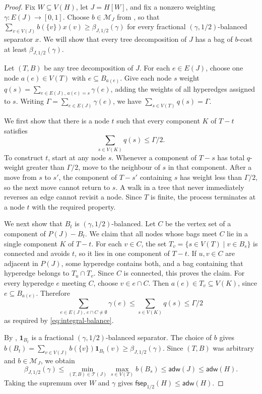 \documentclass[11pt,letterpaper]{article}
\theoremstyle{definition}
\theoremstyle{remark}
\newcommand{\adw}{\mathsf{adw}}
\newcommand{\fsep}{\mathsf{fsep}}
\providecommand{\adw}{\operatorname{adw}}
\begin{document}
\begin{proof}
Fix $W\subseteq V(H)$, let $J=H[W]$, and fix a nonzero weighting
$\gamma:E(J)\to[0,1]$. Choose $b\in\mathcal M_J$ from
, so that
$\sum_{v\in V(J)}b(\{v\})x(v)\ge\beta_{J,1/2}(\gamma)$ for every fractional
$(\gamma,1/2)$-balanced separator $x$.
We will show that every tree decomposition of $J$ has a bag of $b$-cost
at least $\beta_{J,1/2}(\gamma)$.

Let $(T,B)$ be any tree decomposition of $J$. For each $e\in E(J)$,
choose one node $a(e)\in V(T)$ with $e\subseteq B_{a(e)}$. Give each
node $s$ weight $q(s)=\sum_{e\in E(J),\,a(e)=s}\gamma(e)$, adding the
weights of all hyperedges assigned to $s$. Writing
$\Gamma=\sum_{e\in E(J)}\gamma(e)$, we have
$\sum_{s\in V(T)}q(s)=\Gamma$.


We first show that there is a node $t$ such that every component $K$ of $T-t$ satisfies
$$\sum_{s\in V(K)}q(s)\le\Gamma/2.$$ To construct $t$, start at any
node $s$. Whenever a component of $T-s$ has total $q$-weight greater
than $\Gamma/2$, move to the neighbour of $s$ in that component.
After a move from $s$ to $s'$, the component of $T-s'$ containing $s$
has weight less than $\Gamma/2$, so the next move cannot return to $s$.
A walk in a tree that never immediately reverses an edge cannot revisit
a node. Since $T$ is finite, the process terminates at a node $t$ with
the required property.

We next show that $B_t$ is $(\gamma,1/2)$-balanced. Let $C$ be the vertex
set of a component of $P(J)-B_t$. We claim that all nodes whose bags meet
$C$ lie in a single component $K$ of $T-t$. For each $v\in C$, the set
$T_v=\{s\in V(T)\mid v\in B_s\}$ is connected and avoids $t$, so it
lies in one component of $T-t$. If $u,v\in C$ are adjacent in $P(J)$,
some hyperedge contains both, and a bag containing that hyperedge
belongs to $T_u\cap T_v$. Since $C$ is connected, this proves the claim.
For every hyperedge
$e$ meeting $C$, choose $v\in e\cap C$. Then
$a(e)\in T_v\subseteq V(K)$, since $e\subseteq B_{a(e)}$. Therefore
$$\sum_{e\in E(J),\,e\cap C\ne\emptyset}\gamma(e)
\le\sum_{s\in V(K)}q(s)\le\Gamma/2$$
as required by \eqref{eq:integral-balance}.

By , $\mathbf 1_{B_t}$ is a fractional
$(\gamma,1/2)$-balanced separator. The choice of $b$ gives
$b(B_t)=\sum_{v\in V(J)}b(\{v\})\mathbf 1_{B_t}(v)\ge\beta_{J,1/2}(\gamma)$.
Since $(T,B)$ was arbitrary and $b\in\mathcal M_J$, we obtain
\[
 \beta_{J,1/2}(\gamma)
 \le\min_{(T,B)\in\mathcal T(J)}\max_{s\in V(T)}b(B_s)
 \le\adw(J)\le\adw(H).
\]
Taking the supremum over $W$ and $\gamma$
gives $\fsep_{1/2}(H)\le\adw(H)$.
\end{proof}
\end{document}
